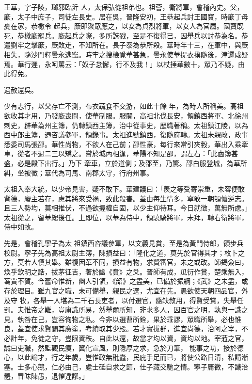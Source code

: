 
\begin{pinyinscope}

 王華，字子陵，瑯邪臨沂
 人，太保弘從祖弟也。祖薈，衛將軍，會稽內史。父，廞，太子中庶子，司徒左長史。居在吳，晉隆安初，王恭起兵討王國寶，時廞丁母憂在家，恭檄令
 起兵，廞即聚眾應之，以女為貞烈將軍，以女人為官屬。國寶既死，恭檄廞罷兵。廞起兵之際，多所誅戮，至是不復得已，因舉兵以討恭為名。恭遣劉牢之擊廞，廞敗走，不知所在。長子泰為恭所殺。華時年十三，在軍中，與廞相失，隨沙門釋曇永逃竄。時牢之搜檢覓華甚急，曇永使華提衣襆隨後，津邏咸疑焉。華行遲，永呵罵云：「奴子怠懈，行不及我！」以杖捶華數十，眾乃不疑，由此得免。



 遇赦還吳。



 少有志行，以父存亡不測，布衣蔬食不交游，如此十餘
 年，為時人所稱美。高祖欲收其才用，乃發廞喪問，使華制服。服闋，高祖北伐長安，領鎮西將軍、北徐州刺史，辟華為州主簿，仍轉鎮西主簿，治中從事史，歷職著稱。太祖鎮江陵，以為西中郎主簿，遷咨議參軍，領錄事。太祖進號鎮西，復隨府轉。太祖未親政，政事悉委司馬張邵。華性尚物，不欲人在己前；邵性豪，每行來常引夾轂，華出入乘牽車，從者不過二三以矯之。嘗於城內相逢，華陽不知是邵，謂左右：「此鹵簿甚盛，必是殿下出行。」乃下
 牽車，立於道側；及邵至，乃驚。邵白服登城，為華所糾，坐被徵；華代為司馬、南郡太守，行府州事。



 太祖入奉大統，以少帝見害，疑不敢下。華建議曰：「羨之等受寄崇重，未容便敢背德，廢主若存，慮其將來受禍，致此殺害。蓋由每生情多，寧敢一朝頓懷逆志。且三人勢均，莫相推伏，不過欲握權自固，以少主仰待耳。今日就徵，萬無所慮。」太祖從之，留華總後任。上即位，以華為侍中，領驍騎將軍，未拜，轉右衛將軍，侍中如故。



 先是，會稽孔寧子為太
 祖鎮西咨議參軍，以文義見賞，至是為黃門侍郎，領步兵校尉。寧子先為高祖太尉主簿，陳損益曰：「隆化之道，莫先於官得其才；枚卜之方，莫若人慎其舉。雖復因革不同，損益有物，求賢審官，未之或改。師錫僉曰，煥乎欽明之誥，拔茅征吉，著於幽《賁》之爻。晉師有成，瓜衍作賞，楚乘無入，蒍賈不賀。今舊命惟新，幽人引領，《韶》之盡美，已備於振綱；《武》之未盡，或存於理目。雖九官之職，未可備舉，親民之選，尤宜在先。愚欲使天朝四品官，外及守
 牧，各舉一人堪為二千石長吏者，以付選官，隨缺敘用，得賢受賞，失舉任罰。夫惟帝之難，豈庸識所易，然舉爾所知，非求多人，因百官之明，孰與一識之見，執咎在己，豈容徇物之私。今非以選曹所銓，果於乖謬，眾職所舉，必也惟良，蓋宜使求賢闢其廣塗，考績取其少殿。若才實拔群，進宜尚德，治阿之宰，不必計年，免徒之守，豈限資秩。自此以還，故當才均以資，資均以地。宰蒞之官，誠曰吏職，然監觀民瘼，翼化宣風，則隱厚之求，急於刀筆，
 能事之功，接於德心，以此論才，行之年歲，豈惟政無秕蠹，民庇手足而已，將使公路日清，私請漸塞。士多心競，仁必由己，處士砥自求之節，仕子藏交馳之情。寧子庸微，不識治體，冒昧陳愚，退懼違謬。」




\end{pinyinscope}
